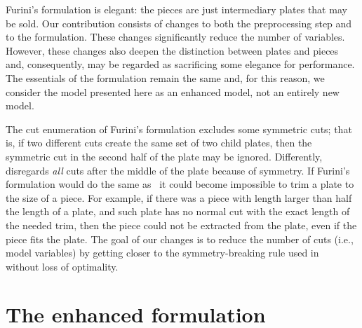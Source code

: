 \documentclass[ppgc,tese,english,formais,babel]{iiufrgs}
\begin{document}
Furini's formulation is elegant: the pieces are just intermediary plates that may be sold.
Our contribution consists of changes to both the preprocessing step and to the formulation.
These changes significantly reduce the number of variables.
However, these changes also deepen the distinction between plates and pieces and, consequently, may be regarded as sacrificing some elegance for performance.
The essentials of the formulation remain the same and, for this reason, we consider the model presented here as an enhanced model, not an entirely new model.


The cut enumeration of Furini's formulation excludes some symmetric cuts; that is, if two different cuts create the same set of two child plates, then the symmetric cut in the second half of the plate may be ignored.
Differently,~\citet{cw:1977} disregards \emph{all} cuts after the middle of the plate because of symmetry.
If Furini's formulation would do the same as~\citet{cw:1977} it could become impossible to trim a plate to the size of a piece.
For example, if there was a piece with length larger than half the length of a plate, and such plate has no normal cut with the exact length of the needed trim, then the piece could not be extracted from the plate, even if the piece fits the plate.
The goal of our changes is to reduce the number of cuts (i.e., model variables) by getting closer to the symmetry-breaking rule used in~\citet{cw:1977} without loss of optimality.


\section{The enhanced formulation}
\label{sec:enhanced}
\end{document}
